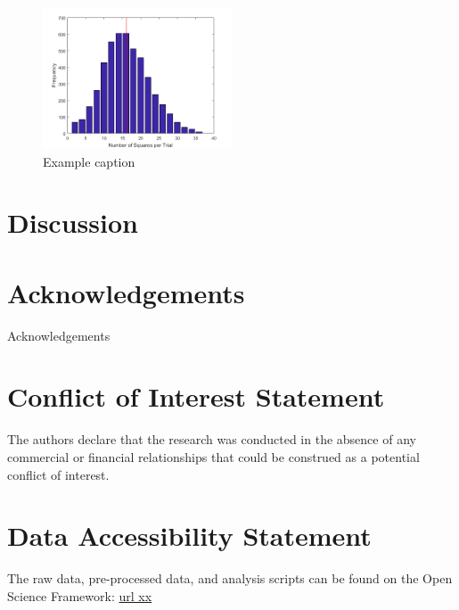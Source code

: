 \documentclass[man,12pt]{apa6} %
\begin{document}
\begin{figure}[h!] %
	\centering	
	\includegraphics[width=0.5\textwidth]{exampleImage.png}
	\caption{Example caption}
	\label{fig:exampleImage}	
\end{figure} 

\section{Discussion}




\section*{Acknowledgements}
Acknowledgements

\section*{Conflict of Interest Statement}

The authors declare that the research was conducted in the absence of any commercial or financial relationships that could be construed as a potential conflict of interest.



\section*{Data Accessibility Statement}
The raw data, pre-processed data, and analysis scripts can be found on the Open Science Framework: \url{url xx}



\end{document}

